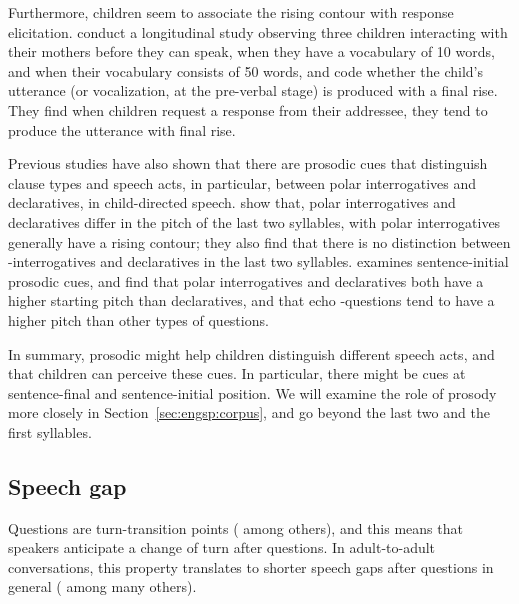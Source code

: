 
Furthermore, children seem to associate the rising contour with response elicitation. \textcite{flax1991prosody} conduct a longitudinal study observing three children interacting with their mothers before they can speak, when they have a vocabulary of 10 words, and when their vocabulary consists of 50 words, and code whether the child's utterance (or vocalization, at the pre-verbal stage) is produced with a final rise. They find when children request a response from their addressee, they tend to produce the utterance with final rise. 

Previous studies have also shown that there are prosodic cues that distinguish clause types and speech acts, in particular, between polar interrogatives and declaratives, in child-directed speech. \textcite{geffenmintz2017final} show that, polar interrogatives and declaratives differ in the pitch of the last two syllables, with polar interrogatives generally have a rising contour; they also find that there is no distinction between \twh-interrogatives and declaratives in the last two syllables. \textcite{chianggeffenmintz2018initial} examines sentence-initial prosodic cues, and find that polar interrogatives and declaratives both have a higher starting pitch than declaratives, and that echo \twh-questions tend to have a higher pitch than other types of questions. %

In summary, prosodic might help children distinguish different speech acts, and that children can perceive these cues. In particular, there might be cues at sentence-final and sentence-initial position. We will examine the role of prosody more closely in Section~\ref{sec:engsp:corpus}, and go beyond the last two and the first syllables.

\subsection{Speech gap}
\label{sec:engsp:bg:pause}
Questions are turn-transition points (\cite{duncan1972turn} among others), and this means that speakers anticipate a change of turn after questions. In adult-to-adult conversations, this property translates to shorter speech gaps after questions in general (\cite{stivers2010,enfield2010,hilbrink2013turn} among many others). 



